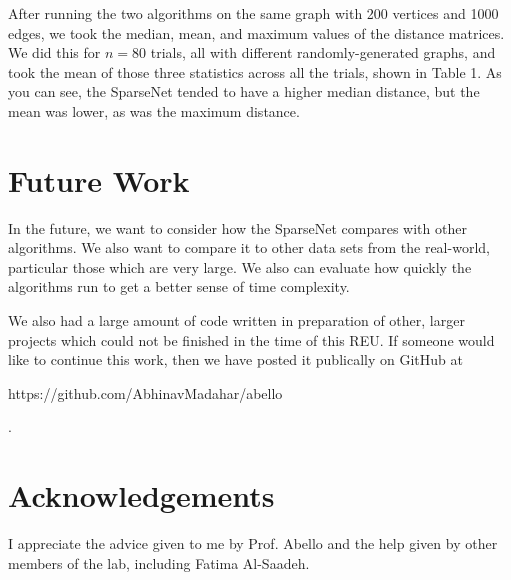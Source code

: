 \documentclass[conference]{IEEEtran}
\begin{document}
After running the two algorithms on the same graph with 200 vertices and 1000 edges, we took the median, mean, and maximum values of the distance matrices.
We did this for $n=80$ trials, all with different randomly-generated graphs, and took the mean of those three statistics across all the trials, shown in Table 1.
As you can see, the SparseNet tended to have a higher median distance, but the mean was lower, as was the maximum distance.

\section{Future Work}

In the future, we want to consider how the SparseNet compares with other algorithms.
We also want to compare it to other data sets from the real-world, particular those which are very large.
We also can evaluate how quickly the algorithms run to get a better sense of time complexity.

We also had a large amount of code written in preparation of other, larger projects which could not be finished in the time of this REU.
If someone would like to continue this work, then we have posted it publically on GitHub at \begin{href}https://github.com/AbhinavMadahar/abello\end{href}.

\section{Acknowledgements}

I appreciate the advice given to me by Prof. Abello and the help given by other members of the lab, including Fatima Al-Saadeh.
\end{document}
